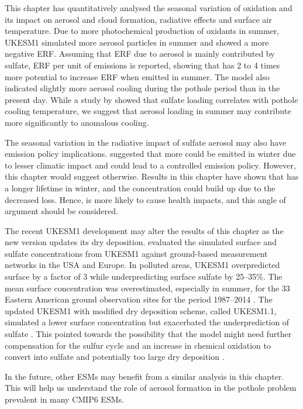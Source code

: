 This chapter has quantitatively analysed the seasonal variation of  oxidation and its impact on aerosol and cloud formation, radiative effects and surface air temperature. Due to more photochemical production of oxidants in summer, UKESM1 simulated more aerosol particles in summer and showed a more negative ERF. Assuming that ERF due to aerosol is mainly contributed by sulfate, ERF per unit of  emissions is reported, showing that  has 2 to 4 times more potential to increase ERF when emitted in summer. The model also indicated slightly more aerosol cooling during the pothole period than in the present day. While a study by \citet{zhangRoleAnthropogenicAerosols2021} showed that sulfate loading correlates with pothole cooling temperature, we suggest that aerosol loading in summer may contribute more significantly to anomalous cooling. 

The seasonal variation in the radiative impact of sulfate aerosol may also have emission policy implications. \citet{bellouinRegionalSeasonalRadiative2016} suggested that more  could be emitted in winter due to lesser climatic impact and could lead to a controlled emission policy. However, this chapter would suggest otherwise. Results in this chapter have shown that  has a longer lifetime in winter, and the concentration could build up due to the decreased loss. Hence,  is more likely to cause health impacts, and this angle of argument should be considered.

The recent UKESM1 development may alter the results of this chapter as the new version updates its  dry deposition. \citet{hardacreEvaluationSO2SO422021} evaluated the simulated surface  and sulfate concentrations from UKESM1 against ground-based measurement networks in the USA and Europe. In polluted areas, UKESM1 overpredicted surface  by a factor of 3 while underpredicting surface sulfate by 25--35\%. The mean surface  concentration was overestimated, especially in summer, for the 33 Eastern American ground observation sites for the period 1987--2014 \citep{hardacreEvaluationSO2SO422021}. The updated UKESM1 with modified  dry deposition scheme, called UKESM1.1, simulated a lower surface  concentration but exacerbated the underprediction of sulfate \citep{mulcahyUKESM11DevelopmentEvaluation2023}. This pointed towards the possibility that the model might need further compensation for the sulfur cycle and an increase in chemical oxidation to convert  into sulfate and potentially too large dry deposition \citep{mulcahyUKESM11DevelopmentEvaluation2023}.

In the future, other ESMs may benefit from a similar analysis in this chapter. This will help us understand the role of aerosol formation in the pothole problem prevalent in many CMIP6 ESMs. 
